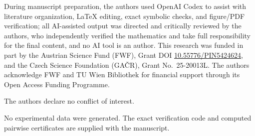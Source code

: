\documentclass[twocolumn,aps,pra,floatfix,amsmath,amssymb,longbibliography]{revtex4-2}
\theoremstyle{definition}
\theoremstyle{remark}
\begin{document}
\begin{acknowledgments}
During manuscript preparation, the authors used OpenAI Codex to assist with literature organization, LaTeX editing, exact symbolic checks, and figure/PDF verification; all AI-assisted output was directed and critically reviewed by the authors, who independently verified the mathematics and take full responsibility for the final content, and no AI tool is an author.
This research was funded in part by the Austrian
Science Fund (FWF), Grant DOI \href{https://doi.org/10.55776/PIN5424624}{10.55776/PIN5424624}, and the Czech Science
Foundation (GA\v{C}R), Grant No.~25-20013L.
The authors acknowledge FWF and TU Wien Bibliothek for financial support through its Open Access Funding Programme.

The authors declare no conflict of interest.

No experimental data were generated.  The exact verification code and
computed pairwise certificates are supplied with the manuscript.
\end{acknowledgments}


\end{document}
